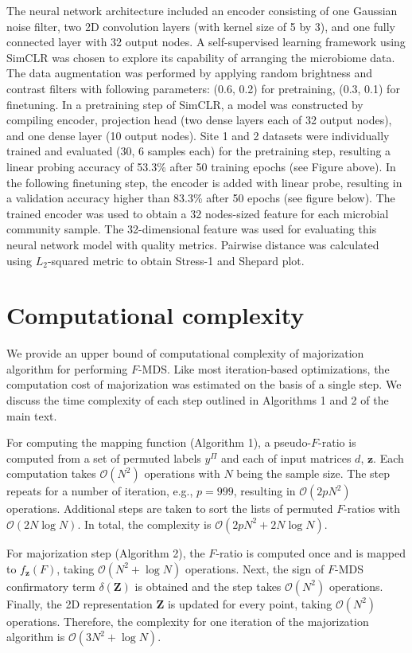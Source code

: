 \documentclass[11pt]{article}
\newcommand{\1}{{\rm 1}\kern-0.24em{\rm I}}
\newcommand{\cO}{\mathcal{O}}
\providecommand{\DIFaddbegin}{} %
\providecommand{\DIFaddend}{} %
\newcommand{\DIFaddincludegraphics}[2][]{{\color{blue}\fbox{\DIFOincludegraphics[#1]{#2}}}} %
\DeclareRobustCommand{\DIFaddbegin}{\DIFOaddbegin \let\includegraphics\DIFaddincludegraphics} %
\DeclareRobustCommand{\DIFaddend}{\DIFOaddend \let\includegraphics\DIFOincludegraphics} %
\begin{document}
The neural network architecture included an encoder consisting of one Gaussian noise filter, two 2D convolution layers (with kernel size of 5 by 3), and one fully connected layer with 32 output nodes. 
A self-supervised learning framework using SimCLR \cite{chen20} was chosen to explore its capability of arranging the microbiome data. The data augmentation was performed by applying random brightness and contrast filters with following parameters: (0.6, 0.2) for pretraining, (0.3, 0.1) for finetuning. In a pretraining step of SimCLR, a model was constructed by compiling encoder, projection head (two dense layers each of 32 output nodes), and one dense layer (10 output nodes). Site 1 and 2 datasets were individually trained and evaluated (30, 6 samples each) for the pretraining step, resulting a linear probing accuracy of 53.3\% after 50 training epochs (see Figure above). In the following finetuning step, the encoder is added with linear probe, resulting in a validation accuracy higher than 83.3\% after 50 epochs (see figure below). The trained encoder was used to obtain a 32 nodes-sized feature for each microbial community sample. The 32-dimensional feature was used for evaluating this neural network model with quality metrics.
Pairwise distance was calculated using $L_2$-squared metric to obtain Stress-1 and Shepard plot.
\DIFaddbegin \clearpage
\DIFaddend 


\section{Computational complexity}

We provide an upper bound of computational complexity of majorization algorithm for performing $F$-MDS.
Like most iteration-based optimizations, the computation cost of majorization was estimated on the basis of a single step.
We discuss the time complexity of each step outlined in Algorithms 1 and 2 of the main text.

For computing the mapping function (Algorithm 1), a pseudo-$F$-ratio is computed from a set of permuted labels $y^\Pi$ and each of input matrices $d$, $\mathbf{z}$.
Each computation takes $\cO(N^2)$ operations with $N$ being the sample size.
The step repeats for a number of iteration, e.g., $p=999$, resulting in $\cO(2pN^2)$ operations.
Additional steps are taken to sort the lists of permuted $F$-ratios with $\cO(2N\log N)$.
In total, the complexity is $\cO(2pN^2 + 2N\log N)$.

For majorization step (Algorithm 2), the $F$-ratio is computed once and is mapped to $f_\mathbf{z}(F)$, taking $\cO(N^2 + \log N)$ operations.
Next, the sign of $F$-MDS confirmatory term $\delta(\mathbf{Z})$ is obtained and the step takes $\cO(N^2)$ operations.
Finally, the 2D representation $\mathbf{Z}$ is updated for every point, taking $\cO(N^2)$ operations.
Therefore, the complexity for one iteration of the majorization algorithm is $\cO(3N^2 + \log N)$.
\end{document}
